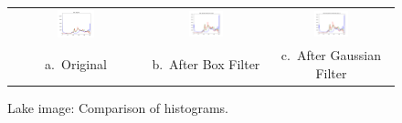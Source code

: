 \documentclass[]{IEEEtran}
\begin{document}
  \begin{figure}[t]
  \centering
  \begin{tabular}{c c c}
  \includegraphics[width=0.3\textwidth]{./figures/3/lake-rgbhist.png} &
  \includegraphics[width=0.3\textwidth]{./figures/3/lake-3-1-1-box9-rgbhist.png} &
  \includegraphics[width=0.3\textwidth]{./figures/3/lake-3-1-1-gaussian15-rgbhist.png} \\
  a.~Original & b.~After Box Filter & c.~After Gaussian Filter
  \end{tabular}
  \caption{Lake image: Comparison of histograms.}
  \label{figure:lake-rgb-hist}
  \end{figure}
\end{document}
